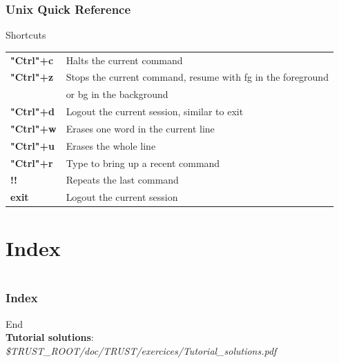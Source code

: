 \documentclass[10pt, hyperref={unicode=true,pdfusetitle, bookmarks=true,bookmarksnumbered=false,bookmarksopen=false, breaklinks=false,pdfborder={0 0 1},backref=true,colorlinks=true,linkcolor=darkblue,pageanchor}]{beamer}
\begin{document}
\begin{frame}
\frametitle{Unix Quick Reference}
\begin{block}{Shortcuts}

\begin{tabular}{ll}
\textbf{"Ctrl"+c} & Halts the current command                                     \tabularnewline
\textbf{"Ctrl"+z} & Stops the current command, resume with fg in the foreground   \tabularnewline
                & or bg in the background                                       \tabularnewline
\textbf{"Ctrl"+d} & Logout the current session, similar to exit                   \tabularnewline
\textbf{"Ctrl"+w} & Erases one word in the current line                           \tabularnewline
\textbf{"Ctrl"+u} & Erases the whole line                                         \tabularnewline
\textbf{"Ctrl"+r} & Type to bring up a recent command                             \tabularnewline
\textbf{!!}     & Repeats the last command                                      \tabularnewline
\textbf{exit}   & Logout the current session                                    \tabularnewline
\end{tabular}

\end{block}
\end{frame}


\section{{\bf{Index}}}
\begin{frame}
\begin{small}
\begin{columns}[c] 
\tableofcontents[sections={1-9},currentsection, currentsubsection]
\tableofcontents[sections={10-16},currentsection, currentsubsection]
\end{columns}
\end{small}
\end{frame}
\begin{frame}[allowframebreaks]
\frametitle{Index}
\printindex
\end{frame}


\begin{frame}
\begin{center}
{\Huge{End}}\\
\vspace{2cm}
\textbf{Tutorial solutions}: \textit{\$TRUST\_ROOT/doc/TRUST/exercices/Tutorial\_solutions.pdf}
\end{center}
\end{frame}
\end{document}
